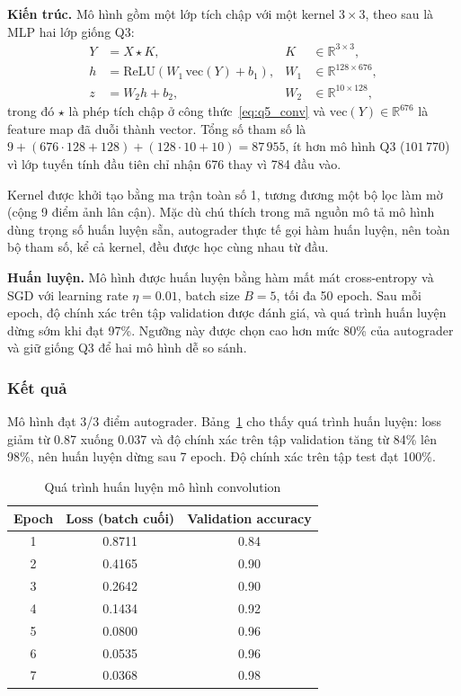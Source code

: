 \textbf{Kiến trúc.} Mô hình gồm một lớp tích chập với một kernel
$3 \times 3$, theo sau là MLP hai lớp giống Q3:
\begin{align}
Y &= X \star K, & K &\in \mathbb{R}^{3 \times 3},\\
h &= \mathrm{ReLU}(W_1\, \mathrm{vec}(Y) + b_1), & W_1 &\in \mathbb{R}^{128 \times 676},\\
z &= W_2 h + b_2, & W_2 &\in \mathbb{R}^{10 \times 128},
\end{align}
trong đó $\star$ là phép tích chập ở công thức~\eqref{eq:q5_conv} và
$\mathrm{vec}(Y) \in \mathbb{R}^{676}$ là feature map đã duỗi thành vector.
Tổng số tham số là
$9 + (676 \cdot 128 + 128) + (128 \cdot 10 + 10) = 87\,955$, ít hơn mô hình
Q3 ($101\,770$) vì lớp tuyến tính đầu tiên chỉ nhận 676 thay vì 784 đầu vào.

Kernel được khởi tạo bằng ma trận toàn số 1, tương đương một bộ lọc làm mờ
(cộng 9 điểm ảnh lân cận). Mặc dù chú thích trong mã nguồn mô tả mô hình
dùng trọng số huấn luyện sẵn, autograder thực tế gọi hàm huấn luyện, nên
toàn bộ tham số, kể cả kernel, đều được học cùng nhau từ đầu.

\textbf{Huấn luyện.} Mô hình được huấn luyện bằng hàm mất mát cross-entropy
và SGD với learning rate $\eta = 0.01$, batch size $B = 5$, tối đa 50 epoch.
Sau mỗi epoch, độ chính xác trên tập validation được đánh giá, và quá trình
huấn luyện dừng sớm khi đạt 97\%. Ngưỡng này được chọn cao hơn mức 80\% của
autograder và giữ giống Q3 để hai mô hình dễ so sánh.

\subsubsection{Kết quả}
Mô hình đạt 3/3 điểm autograder. Bảng~\ref{tab:q5_train} cho thấy quá trình
huấn luyện: loss giảm từ 0.87 xuống 0.037 và độ chính xác trên tập validation
tăng từ 84\% lên 98\%, nên huấn luyện dừng sau 7 epoch. Độ chính xác trên tập
test đạt 100\%.
\begin{table}[htbp]
\caption{Quá trình huấn luyện mô hình convolution}
\label{tab:q5_train}
\centering
\begin{tabular}{ccc}
\toprule
Epoch & Loss (batch cuối) & Validation accuracy \\
\midrule
1 & 0.8711 & 0.84 \\
2 & 0.4165 & 0.90 \\
3 & 0.2642 & 0.90 \\
4 & 0.1434 & 0.92 \\
5 & 0.0800 & 0.96 \\
6 & 0.0535 & 0.96 \\
7 & 0.0368 & 0.98 \\
\bottomrule
\end{tabular}
\end{table}

